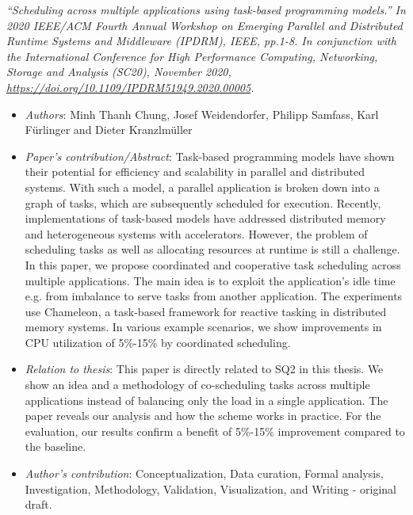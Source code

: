 \textit{``Scheduling across multiple applications using task-based programming models.'' In 2020 IEEE/ACM Fourth Annual Workshop on Emerging Parallel and Distributed Runtime Systems and Middleware (IPDRM), IEEE, pp.1-8. In conjunction with the International Conference for High Performance Computing, Networking, Storage and Analysis (SC20), November 2020, \url{https://doi.org/10.1109/IPDRM51949.2020.00005}.}
\begin{itemize}
	\item \textit{Authors}: Minh Thanh Chung, Josef Weidendorfer, Philipp Samfass, Karl Fürlinger and Dieter Kranzlmüller
	\item \textit{Paper's contribution/Abstract}: Task-based programming models have shown their potential for efficiency and scalability in parallel and distributed systems. With such a model, a parallel application is broken down into a graph of tasks, which are subsequently scheduled for execution. Recently, implementations of task-based models have addressed distributed memory and heterogeneous systems with accelerators. However, the problem of scheduling tasks as well as allocating resources at runtime is still a challenge. In this paper, we propose coordinated and cooperative task scheduling across multiple applications. The main idea is to exploit the application's idle time e.g. from imbalance to serve tasks from another application. The experiments use Chameleon, a task-based framework for reactive tasking in distributed memory systems. In various example scenarios, we show improvements in CPU utilization of 5\%-15\% by coordinated scheduling.
	\item \textit{Relation to thesis}: This paper is directly related to SQ2 in this thesis. We show an idea and a methodology of co-scheduling tasks across multiple applications instead of balancing only the load in a single application. The paper reveals our analysis and how the scheme works in practice. For the evaluation, our results confirm a benefit of 5\%-15\% improvement compared to the baseline.
	\item \textit{Author's contribution}: Conceptualization, Data curation, Formal analysis, Investigation, Methodology, Validation, Visualization, and Writing - original draft.
\end{itemize}

%

